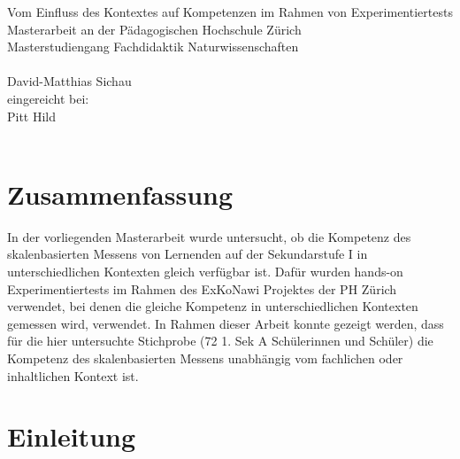 \documentclass[12pt,oneside, DIV11]{scrbook}
\begin{document}
\frontmatter

\begin{titlepage}
	\vspace*{2cm}
	\begin{center}
		{\LARGE Vom Einfluss des Kontextes auf Kompetenzen im Rahmen von Experimentiertests
		 \vspace*{2cm}\\ Masterarbeit an der Pädagogischen Hochschule Zürich\vspace*{1cm}\\Masterstudiengang Fachdidaktik Naturwissenschaften\\}
		\vspace*{2cm}{\normalsize vorgelegt von:}\\ \large David-Matthias Sichau \\
		\vspace*{1.5cm} {\normalsize  eingereicht bei:}\\ \large Pitt Hild \\
		\vspace*{2cm}{\large 05. Februar 2015, Zürich}\\
	\end{center}
\end{titlepage}



\frontmatter 
\tableofcontents



\chapter*{Zusammenfassung}

In der vorliegenden Masterarbeit wurde untersucht, ob die Kompetenz des skalenbasierten Messens von Lernenden auf der Sekundarstufe I in unterschiedlichen Kontexten gleich verfügbar ist. Dafür wurden hands-on Experimentiertests im Rahmen des ExKoNawi Projektes der PH Zürich verwendet, bei denen die gleiche Kompetenz in unterschiedlichen Kontexten gemessen wird, verwendet. In Rahmen dieser Arbeit konnte gezeigt werden, dass für die hier untersuchte Stichprobe (72 1. Sek A Schülerinnen und Schüler) die Kompetenz des skalenbasierten Messens unabhängig vom fachlichen oder inhaltlichen Kontext ist.






\mainmatter


\chapter{Einleitung}

\end{document}
